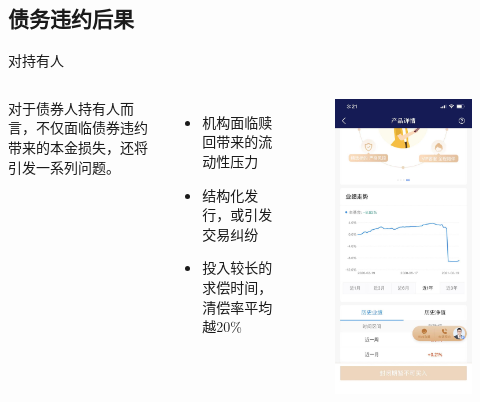 \subsection{债务违约后果}
\begin{frame}{对持有人}
	\begin{columns}[c]
		对于债券人持有人而言，不仅面临债券违约带来的本金损失，还将引发一系列问题。
		\begin{itemize}
			\item 机构面临赎回带来的流动性压力
			\item 结构化发行，或引发交易纠纷
			\item 投入较长的求偿时间，清偿率平均越20\%
		\end{itemize}
		\begin{figure}
			\centering
			\includegraphics[width=0.6\linewidth]{lib/jsfund.jpg}
		\end{figure}
	\end{columns}
\end{frame}
